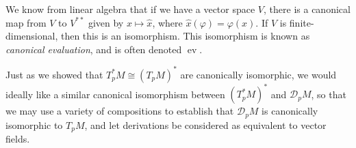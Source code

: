 \documentclass[10pt]{mypackage}
\begin{document}
We know from linear algebra that if we have a vector space $V$, there is a canonical map from $V$ to $V^{\ast\ast}$ given by $x\mapsto \hat{x}$, where $\hat{x}\left( \varphi \right) = \varphi\left( x \right)$. If $V$ is finite-dimensional, then this is an isomorphism. This isomorphism is known as \textit{canonical evaluation}, and is often denoted $ \operatorname{ev} $.
\begin{center}
\end{center}
Just as we showed that $T_p^{\ast}M\cong \left( T_pM \right)^{\ast}$ are canonically isomorphic, we would ideally like a similar canonical isomorphism between $\left( T_p^{\ast}M \right)^{\ast}$ and $ \mathcal{D}_pM $, so that we may use a variety of compositions to establish that $ \mathcal{D}_pM $ is canonically isomorphic to $ T_pM $, and let derivations be considered as equivalent to vector fields.\newline
\end{document}
